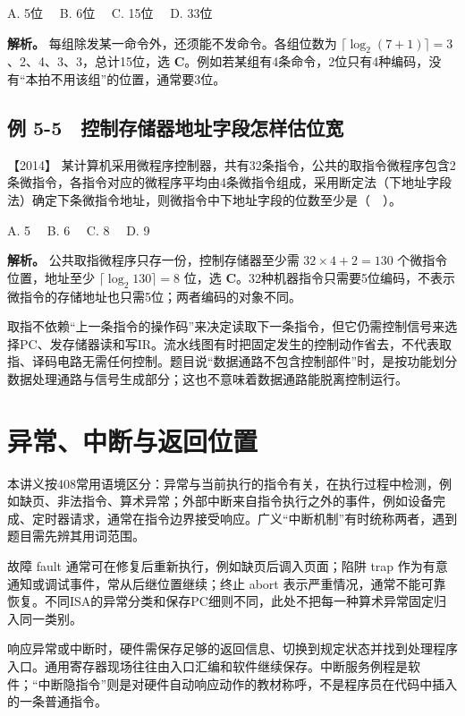 A. 5位　 B. 6位　 C. 15位　 D. 33位


\textbf{解析。} 每组除发某一命令外，还须能不发命令。各组位数为 \(\lceil\log_2(7+1)\rceil=3\)、2、4、3、3，总计15位，选 \textbf{C}。例如若某组有4条命令，2位只有4种编码，没有``本拍不用该组''的位置，通常要3位。

\subsection{例 5-5　控制存储器地址字段怎样估位宽}\label{co-ex5-5}

\noindent{}【2014】 某计算机采用微程序控制器，共有32条指令，公共的取指令微程序包含2条微指令，各指令对应的微程序平均由4条微指令组成，采用断定法（下地址字段法）确定下条微指令地址，则微指令中下地址字段的位数至少是（　）。

A. 5　 B. 6　 C. 8　 D. 9


\textbf{解析。} 公共取指微程序只存一份，控制存储器至少需 \(32\times4+2=130\) 个微指令位置，地址至少 \(\lceil\log_2 130\rceil=8\) 位，选 \textbf{C}。32种机器指令只需要5位编码，不表示微指令的存储地址也只需5位；两者编码的对象不同。

取指不依赖``上一条指令的操作码''来决定读取下一条指令，但它仍需控制信号来选择PC、发存储器读和写IR。流水线图有时把固定发生的控制动作省去，不代表取指、译码电路无需任何控制。题目说``数据通路不包含控制部件''时，是按功能划分数据处理通路与信号生成部分；这也不意味着数据通路能脱离控制运行。

\section{异常、中断与返回位置}\label{co-05-05}

本讲义按408常用语境区分：异常与当前执行的指令有关，在执行过程中检测，例如缺页、非法指令、算术异常；外部中断来自指令执行之外的事件，例如设备完成、定时器请求，通常在指令边界接受响应。广义``中断机制''有时统称两者，遇到题目需先辨其用词范围。

故障 fault 通常可在修复后重新执行，例如缺页后调入页面；陷阱 trap 作为有意通知或调试事件，常从后继位置继续；终止 abort 表示严重情况，通常不能可靠恢复。不同ISA的异常分类和保存PC细则不同，此处不把每一种算术异常固定归入同一类别。

响应异常或中断时，硬件需保存足够的返回信息、切换到规定状态并找到处理程序入口。通用寄存器现场往往由入口汇编和软件继续保存。中断服务例程是软件；``中断隐指令''则是对硬件自动响应动作的教材称呼，不是程序员在代码中插入的一条普通指令。

